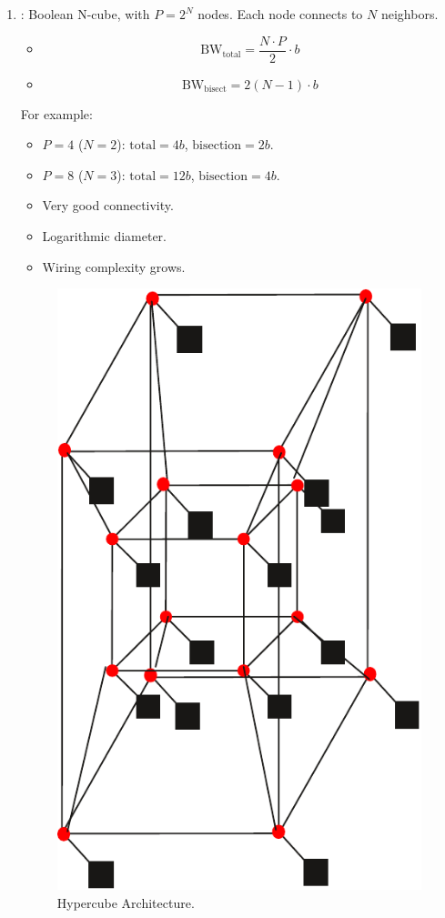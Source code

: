 \begin{enumerate}
    \item {}: Boolean N-cube, with $P = 2^{N}$ nodes. Each node connects to $N$ neighbors.
    \begin{itemize}
        \item {}
        \begin{equation}
            \text{BW}_{\text{total}} = \dfrac{N \cdot P}{2} \cdot b
        \end{equation}
        \item {}
        \begin{equation}
            \text{BW}_{\text{bisect}} = 2(N-1) \cdot b
        \end{equation}
    \end{itemize}
    For example:
    \begin{itemize}
        \item $P = 4$ ($N=2$): $\text{total} = 4b$, $\text{bisection} = 2b$.
        \item $P = 8$ ($N=3$): $\text{total} = 12b$, $\text{bisection} = 4b$.
    \end{itemize}
    \begin{itemize}
        \item[\textcolor{Green3}{\faIcon{check}}] Very good connectivity.
        \item[\textcolor{Green3}{\faIcon{check}}] Logarithmic diameter.
        \item[\textcolor{Red2}{\faIcon{times}}] Wiring complexity grows.
    \end{itemize}
    \begin{figure}[!htp]
        \centering
        \includegraphics[width=.3\textwidth]{img/hypercube.pdf}
        \caption{Hypercube Architecture.\cite{course-slides-polimi}}
    \end{figure}
\end{enumerate}